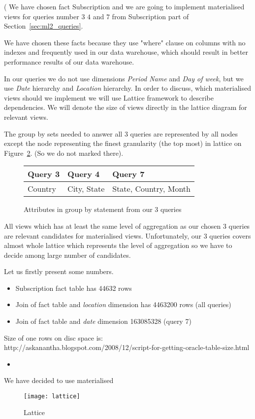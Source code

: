 (
We have chosen fact Subscription and we are going to 
implement materialised views for queries number $3$ $4$ and $7$ from Subscription part of Section~\ref{sec:ml2_queries}.
    
 We have chosen these facts because they use "where" clause on columns with no indexes 
 and frequently used in our data warehouse, which should result in better performance results
 of our data warehouse.

 In our queries we do not use dimensions {\it Period Name} and {\it Day of week}, but 
 we use {\it Date} hierarchy and {\it Location} hierarchy. 
 In order to discuss, which materialised views should we implement we will use Lattice framework to describe dependencies. We will denote the size of views directly in the lattice diagram for relevant views.

 The group by sets needed to answer all 3 queries are represented by all nodes except the node representing the finest granularity (the top most) in lattice on Figure~\ref{fig:lattice}. (So we do not marked there).

\begin{figure}[!hbp]
\caption{\label{t:attrib}Attributes in group by statement from our 3 queries}
\begin{center}
\begin{tabular}{|p{3cm}|p{3cm}|p{5cm}|}
\hline
Query 3 & Query 4 & Query  7\\
\hline
\hline
Country & City, State  & State, Country, Month\\
\hline
\end{tabular}
\end{center}
\end{figure}
 All views which has at least the same level of aggregation as our chosen 3 queries are relevant candidates for materialised views. Unfortunately, our 3 queries covers almost whole lattice which represents the level of aggregation so we have to decide among large number of candidates.

Let us firstly present some numbers.
\begin{itemize}
    \item Subscription fact table has 44632 rows
    \item Join of fact table and {\it location} dimension has 4463200 rows (all queries)
    \item Join of fact table and {\it date} dimension 163085328          (query 7)
\end{itemize}
Size of one rows on disc space is:
http://askanantha.blogspot.com/2008/12/script-for-getting-oracle-table-size.html
\begin{itemize}
    \item 
\end{itemize}
We have decided to use materialised

\begin{figure}[!hbp]
\begin{center}
  \texttt{[image: lattice]}
\caption{\label{fig:lattice}  Lattice}
\end{center}
\end{figure}


